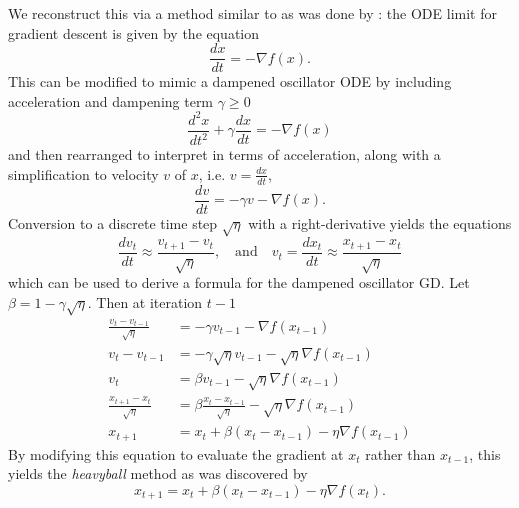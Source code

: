 \documentclass{article}
\newcommand{\dv}[2]{\frac{d #1}{d #2}}
\theoremstyle{definition}
\begin{document}
We reconstruct this via a method similar to as was done by
\citeauthor{10.1214/18-EJS1395}: the ODE limit for gradient descent is given by
the equation
\begin{equation}
    \dv{x}{t} = -\nabla f(x).
\end{equation}
This can be modified to mimic a dampened oscillator ODE by including acceleration
and dampening term $\gamma \geq 0$
\begin{equation}
    \dv{^2 x}{t^2}  + \gamma \dv{x}{t} = -\nabla f(x)
\end{equation}
and then rearranged to interpret in terms of acceleration, along with a
simplification to velocity $v$ of $x$, i.e.  $v = \dv{x}{t}$,
\begin{equation}
    \dv{v}{t}  =  -\gamma v -\nabla f(x).
\end{equation}
Conversion to a discrete time step $\sqrt{\eta}$ with a right-derivative yields the equations
\begin{equation}
    \label{eq:der}
    \dv{v_t}{t} \approx \frac{v_{t + 1} - v_t}{\sqrt{\eta}}, \quad \text{and}
    \quad v_{t} = \dv{x_t}{t} \approx \frac{x_{t + 1} - x_t}{\sqrt{\eta}}
\end{equation}
which can be used to derive a formula for the dampened oscillator GD. Let $\beta
= 1 - \gamma \sqrt{\eta}$. Then at iteration $t - 1$
\begin{equation}
    \label{eq:formula}
    \begin{aligned}
        \frac{v_{t} - v_{t - 1}}{\sqrt{\eta}} &= -\gamma v_{t - 1} -\nabla
        f(x_{t - 1}) \\
        v_{t} - v_{t - 1} &= -\gamma\sqrt\eta v_{t - 1} -\sqrt \eta \nabla
        f(x_{t - 1}) \\
        v_{t} &= \beta v_{t - 1} - \sqrt{\eta} \nabla f(x_{t - 1})\\
        \frac{x_{t + 1} - x_t}{\sqrt{\eta}} &= \beta \frac{x_{t}
        - x_{t - 1}}{\sqrt{\eta}} - \sqrt{\eta} \nabla f(x_{t - 1}) \\
        x_{t + 1} &= x_t + \beta (x_{t} - x_{t - 1}) - \eta \nabla f(x_{t - 1})
    \end{aligned}
\end{equation}
By modifying this equation to evaluate the gradient at $x_t$ rather
than $x_{t - 1}$, this yields the \emph{heavyball} method as was discovered by
\citeauthor{heavyball}
\begin{equation}
    \label{eq:heavyball}
        x_{t + 1} = x_t + \beta (x_{t} - x_{t - 1}) - \eta \nabla f(x_t).
\end{equation}
\end{document}
